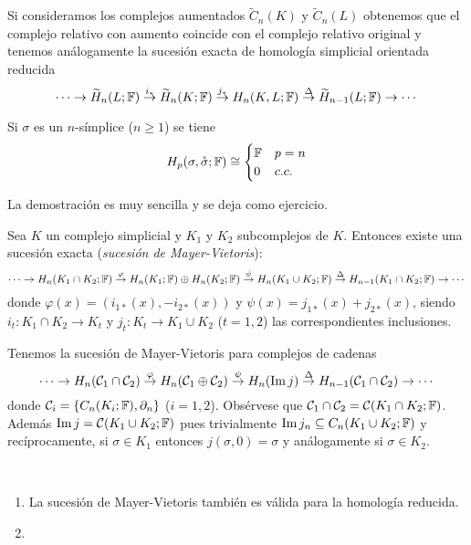 \documentclass[HS.tex]{subfiles}
\begin{document}
\begin{nota}
Si consideramos los complejos aumentados $\widetilde{C}_n(K)$ y $\widetilde{C}_n(L)$ obtenemos que el complejo relativo con aumento coincide con el complejo relativo original y tenemos análogamente la sucesión exacta de homología simplicial orientada reducida
\[
\cdots\to \widetilde{H}_n(L;\mathbb{F})\overset{i_*}{\to} \widetilde{H}_n(K;\mathbb{F})\overset{j_*}{\to} H_n(K,L;\mathbb{F})\overset{\Delta}{\to} \widetilde{H}_{n-1}(L;\mathbb{F})\to\cdots
\]
\end{nota}

\begin{prop}
Si $\sigma$ es un $n$-símplice ($n\geq 1$) se tiene
\[
H_p(\sigma,\mathring{\sigma};\mathbb{F})\cong\begin{cases}
\mathbb{F} & p=n\\
0 & c.c.
\end{cases}
\]
\end{prop}

La demostración es muy sencilla y se deja como ejercicio. 

\begin{prop}
Sea $K$ un complejo simplicial y $K_1$ y $K_2$ subcomplejos de $K$. Entonces existe una sucesión exacta (\emph{sucesión de Mayer-Vietoris}):
\[
\cdots\to H_n(K_1\cap K_2;\mathbb{F})\overset{\varphi}{\to}H_n(K_1;\mathbb{F})\oplus H_n(K_2;\mathbb{F})\overset{\psi}{\to}H_n(K_1\cup K_2;\mathbb{F})\overset{\Delta}{\to}H_{n-1}(K_1\cap K_2;\mathbb{F})\to\cdots
\]
donde $\varphi(x)=(i_{1*}(x),-i_{2*}(x))$ y $\psi(x)=j_{1*}(x)+j_{2*}(x)$, siendo $i_t:K_1\cap K_2\to K_t$ y $j_t:K_t\to K_1\cup K_2$  ($t=1,2$) las correspondientes inclusiones.
\end{prop}

\begin{dem}
Tenemos la sucesión de Mayer-Vietoris para complejos de cadenas
\[
\cdots\to H_n(\mathcal{C}_1\cap\mathcal{C}_2)\overset{\varphi}{\to}H_n(\mathcal{C}_1\oplus\mathcal{C}_2)\overset{\psi}{\to}H_n(\operatorname{Im}{j})\overset{\Delta}{\to}H_{n-1}(\mathcal{C}_1\cap\mathcal{C}_2)\to\cdots
\]
donde $\mathcal{C}_i=\{C_n(K_i;\mathbb{F}),\partial_n\}$ ($i=1,2$). Obsérvese que $\mathcal{C}_1\cap\mathcal{C}_2=\mathcal{C}(K_1\cap K_2;\mathbb{F})$. Además $\operatorname{Im}{j}=\mathcal{C}(K_1\cup K_2;\mathbb{F})$ pues trivialmente $\operatorname{Im}{j_n}\subseteq C_n(K_1\cup K_2;\mathbb{F})$ y recíprocamente, si $\sigma\in K_1$ entonces $j(\sigma,0)=\sigma$ y análogamente si $\sigma\in K_2$. 
\QED
\end{dem}

\begin{nota}\
\begin{enumerate}
\item La sucesión de Mayer-Vietoris también es válida para la homología reducida. 
\item 
\end{enumerate}
\end{nota}
\end{document}

